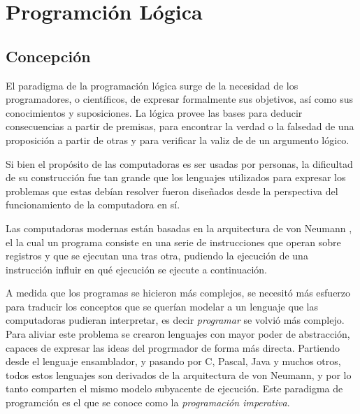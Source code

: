 \documentclass[12pt,titlepage]{article}
\begin{document}

\setcounter{page}{1}

\tableofcontents
\newpage



\clearpage	

\setlength{\parindent}{0pt}
\setlength{\parskip}{1ex plus 0.5ex minus 0.2ex}



\section{Programción Lógica}
\subsection{Concepción}

El paradigma de la programación lógica surge de la necesidad de los programadores, o científicos, de expresar formalmente sus objetivos, así como sus conocimientos y suposiciones. La lógica provee las bases para deducir consecuencias a partir de premisas, para encontrar la verdad o la falsedad de una proposición a partir de otras y para verificar la valiz de de un argumento lógico.

Si bien el propósito de las computadoras es ser usadas por personas, la dificultad de su construcción fue tan grande que los lenguajes utilizados para expresar los problemas que estas debían resolver fueron diseñados desde la perspectiva del funcionamiento de la computadora en sí.

Las computadoras modernas están basadas en la arquitectura de von Neumann \cite{vonneumann}, el la cual un programa consiste en una serie de instrucciones que operan sobre registros y que se ejecutan una tras otra, pudiendo la ejecución de una instrucción influir en qué ejecución se ejecute a continuación.

A medida que los programas se hicieron más complejos, se necesitó más esfuerzo para traducir los conceptos que se querían modelar a un lenguaje que las computadoras pudieran interpretar, es decir \emph{programar} se volvió más complejo. Para aliviar este problema se crearon lenguajes con mayor poder de abstracción, capaces de expresar las ideas del progrmador de forma más directa. Partiendo desde el lenguaje ensamblador, y pasando por C, Pascal, Java y muchos otros, todos estos lenguajes son derivados de la arquitectura de von Neumann, y por lo tanto comparten el mismo modelo subyacente de ejecución. Este paradigma de programción es el que se conoce como la \emph{programación imperativa}.
\end{document}
